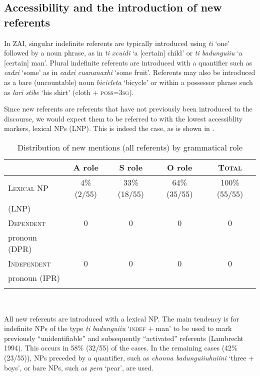 \subsection{Accessibility and the introduction of new referents}\label{accessiblityandnew}

In ZAI, singular indefinite referents are typically introduced using \textit{ti} `one' followed by a noun phrase, as in \textit{ti xcuidi} `a {[}certain{]} child' or \textit{ti badunguiiu} `a {[}certain{]} man'. Plural indefinite referents are introduced with a quantifier such as \textit{cadxi} `some' as in \textit{cadxi cuananaxhi} `some fruit'. Referents may also be introduced as a bare (uncountable) noun \textit{bicicleta} `bicycle'  or within a possessor phrase such as \textit{lari stibe} `his shirt' (cloth + \textsc{poss}=3\textsc{sg}).


Since new referents are referents that have not previously been introduced to the discourse, we would expect them to be referred to with the lowest accessiblity markers, lexical NPs (LNP). This is indeed the case, as is shown in .

\begin{table}  

\caption{{Distribution of new mentions (all referents) by grammatical role}}
\begin{tabular}{| l  c  c  c  c }
\lsptoprule
 & A role & S role & O role & \textsc{Total} \\

\midrule
 \textsc{Lexical NP} & 4{\%} (2/55) & 33{\%} (18/55) & 64{\%} (35/55) & 100{\%} (55/55) \\
 (LNP) & & & & \\

\midrule
 \textsc{Dependent} & 0 & 0  &  0 &  0  \\
pronoun (DPR) & & & & \\

\midrule
 \textsc{Independent} & 0 & 0  & 0 &  0 \\
 pronoun (IPR) & & & & \\

\lspbottomrule
\end{tabular}\\
\label{newreferents}

\end{table} 
All new referents are introduced with a lexical NP. The main tendency is for indefinite NPs of the type \textit{ti badunguiiu} {`}\textsc{indef} + man{'} to be used to mark previously ``unidentifiable'' and subsequently ``activated'' referents (Lambrecht 1994). This occurs in 58{\%} (32/55) of the cases. In the remaining cases (42{\%} (23/55)), NPs preceded by a quantifier, such as \textit{chonna badunguiiuhuiini} {`}three + boys{'}, or bare NPs, such as \textit{pera} `pear', are used. 

